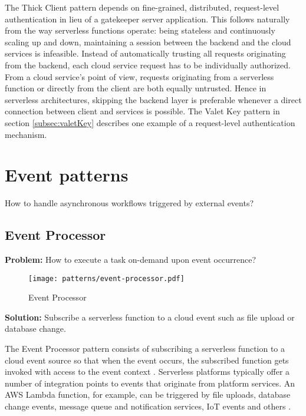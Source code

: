 The Thick Client pattern depends on fine-grained, distributed, request-level authentication in lieu of a gatekeeper server application. This follows naturally from the way serverless functions operate: being stateless and continuously scaling up and down, maintaining a session between the backend and the cloud services is infeasible. Instead of automatically trusting all requests originating from the backend, each cloud service request has to be individually authorized. From a cloud service's point of view, requests originating from a serverless function or directly from the client are both equally untrusted. Hence in serverless architectures, skipping the backend layer is preferable whenever a direct connection between client and services is possible. The Valet Key pattern in section \ref{subsec:valetKey} describes one example of a request-level authentication mechanism. \parencite{adzic2017serverless}

\section{Event patterns} \label{sec:eventPatterns}

How to handle asynchronous workflows triggered by external events?

\subsection{Event Processor} \label{subsec:Eventprocessing}

\textbf{Problem:} How to execute a task on-demand upon event occurrence?

\begin{figure}[h]
  \centering
  \texttt{[image: patterns/event-processor.pdf]}
  \caption{Event Processor}
  \label{fig:patternEventProcessor}
\end{figure}

\textbf{Solution:} Subscribe a serverless function to a cloud event such as file upload or database change.

The Event Processor pattern consists of subscribing a serverless function to a cloud event source so that when the event occurs, the subscribed function gets invoked with access to the event context \parencite{hong18securingviaserverlesspatterns}. Serverless platforms typically offer a number of integration points to events that originate from platform services. An AWS Lambda function, for example, can be triggered by file uploads, database change events, message queue and notification services, IoT events and others \parencite{awslambda0218}.

